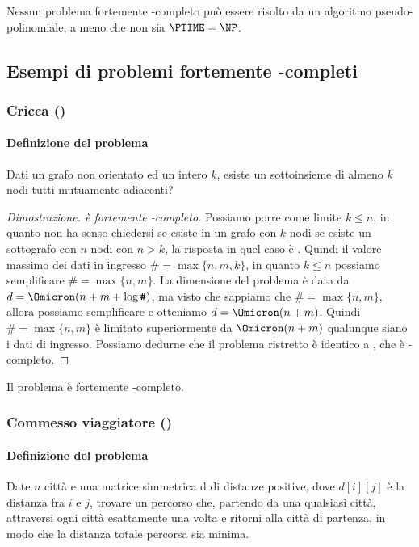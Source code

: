 \begin{theorem}
Nessun problema fortemente \NP-completo può essere risolto da un algoritmo pseudo-polinomiale, a meno che non sia \(\PTIME = \NP\).
\end{theorem}

\subsection{Esempi di problemi fortemente \NP-completi}

\subsubsection{Cricca (\cliqueProblem)}

\paragraph{Definizione del problema}
Dati un grafo non orientato ed un intero \(k\), esiste un sottoinsieme di almeno \(k\) nodi tutti mutuamente adiacenti?

\begin{proof}[Dimostrazione. {\cliqueProblem} è fortemente \NP-completo]
Possiamo porre come limite \(k \leqslant n\), in quanto non ha senso chiedersi se esiste in un grafo con \(k\) nodi se esiste un sottografo con \(n\) nodi con \(n > k\), la risposta in quel caso è \False.
Quindi il valore massimo dei dati in ingresso \(\texttt{\#} = \max\{n,m,k\}\), in quanto \(k \leqslant n\) possiamo semplificare \(\texttt{\#} = \max\{n,m\}\).
La dimensione del problema è data da \(d = \Omicron(n + m + \log\texttt{\#})\), ma visto che sappiamo che \(\texttt{\#} = \max\{n,m\}\), allora possiamo semplificare e otteniamo \(d = \Omicron(n + m)\).
Quindi \(\texttt{\#} = \max\{n, m\}\) è limitato superiormente da \(\Omicron(n + m)\) qualunque siano i dati di ingresso.
Possiamo dedurne che il problema ristretto è identico a {\cliqueProblem}, che è \NP-completo.
\end{proof}

\begin{note}
Il problema {\cliqueProblem} è fortemente \NP-completo.
\end{note}

\subsubsection{Commesso viaggiatore (\tsp)}

\paragraph{Definizione del problema}
Date \(n\) città e una matrice simmetrica d di distanze positive, dove \(d[i][j]\) è la distanza fra \(i\) e \(j\), trovare un percorso che, partendo da una qualsiasi città, attraversi ogni città esattamente una volta e ritorni alla città di partenza, in modo che la distanza totale percorsa sia minima.

